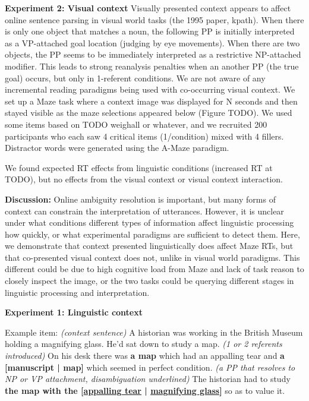 \documentclass[11pt,a4paper]{article}
\begin{document}
\medskip
\noindent\textbf{Experiment 2: Visual context} Visually presented context appears to affect online sentence parsing in visual world tasks (the 1995 paper, kpath). When there is only one object that matches a noun, the following PP is initially interpreted as a VP-attached goal location (judging by eye movements). When there are two objects, the PP seems to be immediately interpreted as a restrictive NP-attached modifier. This leads to strong reanalysis penalties when an another PP (the true goal) occurs, but only in 1-referent conditions. We are not aware of any incremental reading paradigms being used with co-occurring visual context. We set up a Maze task where a context image was displayed for N seconds and then stayed visible as the maze selections appeared below (Figure TODO). We used some items based on TODO weighall or whatever, and we recruited 200 participants who each saw 4 critical items (1/condition) mixed with 4 fillers. Distractor words were generated using the A-Maze paradigm. 

We found expected RT effects from linguistic conditions (increased RT at TODO), but no effects from the visual context or visual context interaction. 

\medskip
\noindent\textbf{Discussion:} Online ambiguity resolution is important, but many forms of context can constrain the interpretation of utterances. However, it is unclear under what conditions different types of information affect linguistic processing how quickly, or what experimental paradigms are sufficient to detect them. Here, we demonstrate that context presented linguistically does affect Maze RTs, but that co-presented visual context does not, unlike in visual world paradigms. This different could be due to high cognitive load from Maze and lack of task reason to closely inspect the image, or the two tasks could be querying different stages in linguistic processing and interpretation. 


\newpage

\begin{center}\textbf{Experiment 1: Linguistic context}\end{center}

\begin{minipage}{\textwidth}
\begin{small}
Example item:  \textit{(context sentence)} A historian was working in the British Museum holding a magnifying glass. He'd sat down to study  a map. 
\textit{(1 or 2 referents introduced)} On his desk there was \textbf{a map} which had an appalling tear and \textbf{a  {[manuscript | map]}} which seemed in perfect condition. \textit{(a PP that resolves to NP or VP attachment, disambiguation underlined)} The historian had to study \textbf{the map with the {[\uline{appalling  tear} | 
		\uline{magnifying glass}]}} so as to value it.
\end{small} 
\medskip
\end{minipage}
\end{document}
